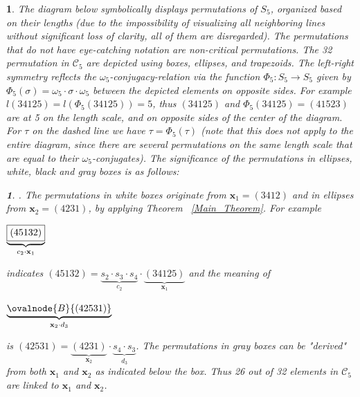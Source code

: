 \documentclass[a4 paper,12pt]{article}
\newtheorem{numeris}{}[section]
\newtheorem{subnum}{}[numeris]
\begin{document}
\begin{numeris} 
The diagram below symbolically   displays   permutations of $S_5$, organized based on their lengths (due to the impossibility of visualizing all neighboring lines without significant loss of clarity, all of them are disregarded). The permutations that do not have \textit{eye-catching} notation are non-critical permutations. The 32 permutation in $\mathcal{C}_{5}$  are depicted  using boxes, ellipses, and trapezoids. 
The left-right symmetry reflects the $\omega_5$-conjugacy-relation via the function $\Phi_5: S_5 \to S_5$ given by $\Phi_5(\sigma) =\omega_5\cdot  \sigma \cdot  \omega_5 $ between the depicted elements on opposite sides. For example  $l(34125)=l(\Phi_5(34125)) =5$, thus  $(34125)$ and $\Phi_5(34125) = (41523)$ are at 5 on the length scale,  and on opposite sides of the center of the diagram.
 For  $\tau$ on the dashed line we have $\tau = \Phi_5(\tau)$ (note that this does not apply to the entire diagram, since there are several permutations on the same length scale that are equal to their $\omega_5$-conjugates). 
The significance of the  permutations in ellipses, white, black and gray boxes is as follows:
 \begin{subnum}. The permutations in  white boxes  originate from  $\textbf{x}_1 = (3412) $ and  in  ellipses from $\textbf{x}_2 = (4231)$,  by applying Theorem ~\ref{Main_Theorem}. For example \begin{scriptsize}$\underbrace{\framebox{(45132)}}_{c_2\cdot  \textbf{x}_1}$\end{scriptsize} indicates  $(45132) = \underbrace{s_2\cdot  s_3\cdot  s_4}_{c_2}\cdot  \underbrace{(34125)}_{\textbf{x}_1}$ and the meaning of \begin{scriptsize}$\underbrace{\ovalnode{B}{(42531)}}_{\textbf{x}_2\cdot  d_3}$\end{scriptsize} is $(42531) = \underbrace{(4231)}_{\textbf{x}_2}\cdot  \underbrace{s_4\cdot  s_3}_{d_3}$. 
The permutations in  gray boxes can be "\textit{derived}" from both $\textbf{x}_{1}$ and $\textbf{x}_{2}$ as indicated below the box. 
Thus 26 out of 32  elements in $\mathcal{C}_{5}$ are linked to $\textbf{x}_1$  and $\textbf{x}_2$.
\label{crit_in_S_5_from_S_4}  

\end{subnum}
\end{numeris}
\end{document}
